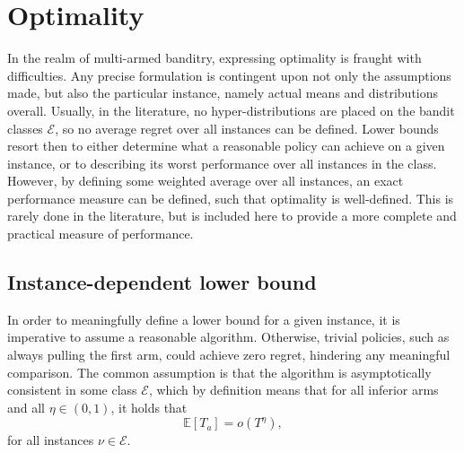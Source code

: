 \section{Optimality}
\label{sec:optimality}
In the realm of multi-armed banditry, expressing optimality is fraught with difficulties.
Any precise formulation is contingent upon not only the assumptions made, but also the particular instance, namely actual means and distributions overall.
Usually, in the literature, no hyper-distributions are placed on the bandit classes $\mathcal{E}$, so no average regret over all instances can be defined.
Lower bounds resort then to either determine what a reasonable policy can achieve on a given instance, or to describing its worst performance over all instances in the class.
However, by defining some weighted average over all instances, an exact performance measure can be defined, such that optimality is well-defined.
This is rarely done in the literature, but is included here to provide a more complete and practical measure of performance.

\subsection{Instance-dependent lower bound}
In order to meaningfully define a lower bound for a given instance, it is imperative to assume a reasonable algorithm.
Otherwise, trivial policies, such as always pulling the first arm, could achieve zero regret, hindering any meaningful comparison.
The common assumption is that the algorithm is asymptotically consistent in some class $\mathcal{E}$, which by definition means that for all inferior arms and all $\eta \in (0, 1)$, it holds that
\begin{equation}
    \mathbb{E}[T_a] = o(T^{\eta}),
\end{equation}
for all instances $\nu \in \mathcal{E}$.

